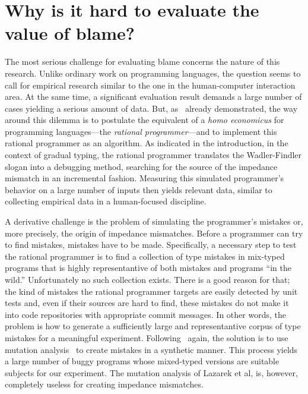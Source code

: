 
\section{Why is it hard to evaluate the value of blame?}
\label{sec:challenges}

The most serious challenge for evaluating blame concerns 
the nature of this research. Unlike ordinary
work on programming languages, the question seems to call for empirical research
similar to the one in the human-computer interaction area. At the same time, a
significant evaluation result demands a large number of cases yielding a serious
amount of data. But, as~\citet{lksfd-popl-2020} already demonstrated, the way
around this dilemma is to postulate the equivalent of a {\it homo economicus\/}
for programming languages---the {\em rational programmer\/}---and to implement
this rational programmer as an algorithm.  As indicated in the introduction, in
the context of gradual typing, the rational programmer translates the
Wadler-Findler slogan into a debugging method, searching for the source of the
impedance mismatch in an incremental fashion. Measuring this simulated
programmer's behavior on a large number of inputs then yields relevant 
data, similar to collecting empirical data in a human-focused discipline. 

A derivative challenge is the problem of simulating the programmer's
mistakes or, more precisely, the origin of impedance mismatches. Before a
programmer can try to find mistakes, mistakes have to be made.
Specifically, a necessary step to test the rational programmer is to find
a collection of  type mistakes in  mix-typed programs that is highly
representantive of both mistakes and programs ``in the wild.''
Unfortunately no such collection exists.  There is a good reason for that;
the kind of mistakes the rational programmer targets are easily detected
by unit tests and, even if their sources are hard to find, these mistakes do not make it
into code repositories with appropriate commit messages.  In other words, the problem is how to generate a
sufficiently large and representantive corpus of type mistakes for a meaningful
experiment.  Following~\citet{lksfd-popl-2020} again, the solution is to
use mutation analysis~\cite{lipton1971fault, demillo1978hints,
jia2011analysis} to create mistakes in a synthetic manner. This process
yields a large number of buggy programs whose mixed-typed versions are
suitable subjects for our experiment.  The mutation analysis of Lazarek et
al, is, however, completely useless for creating impedance mismatches.

